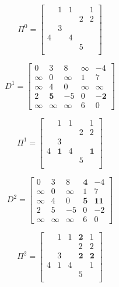 			\begin{equation}
				\Pi^0 = \begin{bmatrix}
					& 1 & 1 & & 1 \\
					& & & 2 & 2\\
					& 3 & & & \\
					4 & & 4 & & \\
					& & & 5 & \\
				\end{bmatrix}
			\end{equation}

			\begin{equation}
				D^1 = \begin{bmatrix}
					0 & 3 & 8 &\infty & -4 \\
					\infty & 0  &\infty & 1 & 7 \\
					\infty & 4 & 0 &\infty &\infty\\
					2 & \mathbf{5} & -5 & 0 &\mathbf{-2}\\
					\infty & \infty & \infty & 6 & 0
				\end{bmatrix}
			\end{equation}

			\begin{equation}
				\Pi^1 = \begin{bmatrix}
					& 1 & 1 & & 1 \\
					& & & 2 & 2\\
					& 3 & & & \\
					4 & \mathbf{1} & 4 & & \mathbf{1}\\
					& & & 5 & \\
				\end{bmatrix}
			\end{equation}

			\begin{equation}
				D^2 = \begin{bmatrix}
					0 & 3 & 8 &\mathbf{4} & -4 \\
					\infty & 0  &\infty & 1 & 7 \\
					\infty & 4 & 0 &\mathbf{5} &\mathbf{11}\\
					2 & 5 & -5 & 0 &-2\\
					\infty & \infty & \infty & 6 & 0
				\end{bmatrix}
			\end{equation}

			\begin{equation}
				\Pi^2 = \begin{bmatrix}
					& 1 & 1 & \mathbf{2} & 1 \\
					& & & 2 & 2\\
					& 3 & & \mathbf{2} & \mathbf{2} \\
					4 & 1 & 4 & & 1\\
					& & & 5 & \\
				\end{bmatrix}
			\end{equation}

